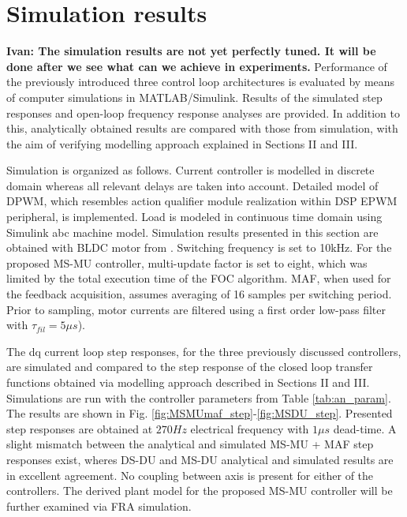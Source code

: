 \documentclass[journal]{IEEEtran}
\begin{document}
\section{Simulation results}
\textbf{Ivan: The simulation results are not yet perfectly tuned. It will be done after we see what can we achieve in experiments.}
Performance of the previously introduced three control loop architectures is evaluated by means of computer simulations in MATLAB/Simulink. Results of the simulated step responses and open-loop frequency response analyses are provided. In addition to this, analytically obtained results are compared with those from simulation, with the aim of verifying modelling approach explained in Sections II and III. \par
Simulation is organized as follows. Current controller is modelled in discrete domain whereas all relevant delays are taken into account. Detailed model of DPWM, which resembles action qualifier module realization within DSP EPWM peripheral, is implemented. Load is modeled in continuous time domain using Simulink abc machine model. Simulation results presented in this section are obtained with BLDC motor from \cite{vuksa2016}. Switching frequency is set to 10kHz. For the proposed MS-MU controller, multi-update factor is set to eight, which was limited by the total execution time of the FOC algorithm. MAF, when used for the feedback acquisition, assumes averaging of 16 samples per switching period. Prior to sampling, motor currents are filtered using a first order low-pass filter with $\tau_{fil} = 5 \mu s$). \par
The dq current loop step responses, for the three previously discussed controllers, are simulated and compared to the step response of the closed loop transfer functions obtained via modelling approach described in Sections II and III. Simulations are run with the controller parameters from Table \ref{tab:an_param}. The results are shown in Fig. \ref{fig:MSMUmaf_step}-\ref{fig:MSDU_step}. Presented step responses are obtained at $270 Hz$ electrical frequency with $1 \mu s$ dead-time. A slight mismatch between the analytical and simulated MS-MU + MAF step responses exist, wheres DS-DU and MS-DU analytical and simulated results are in excellent agreement. No coupling between axis is present for either of the controllers. The derived plant model for the proposed MS-MU controller will be further examined via FRA simulation. \par
\end{document}
